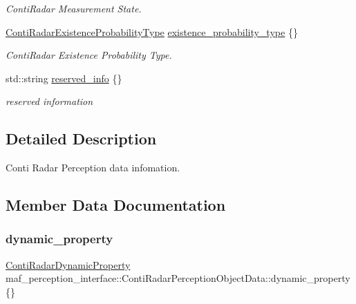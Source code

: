 \begin{DoxyCompactItemize}
\begin{DoxyCompactList}\small\item\em Conti\+Radar Measurement State. \end{DoxyCompactList}\item 
\hyperlink{structmaf__perception__interface_1_1ContiRadarExistenceProbabilityType}{Conti\+Radar\+Existence\+Probability\+Type} \hyperlink{structmaf__perception__interface_1_1ContiRadarPerceptionObjectData_ae0603b941a9d4936c0d31b8f5e3179dd}{existence\+\_\+probability\+\_\+type} \{\}
\begin{DoxyCompactList}\small\item\em Conti\+Radar Existence Probability Type. \end{DoxyCompactList}\item 
std\+::string \hyperlink{structmaf__perception__interface_1_1ContiRadarPerceptionObjectData_aba3e7e81f7f990656c1610c39377b168}{reserved\+\_\+info} \{\}
\begin{DoxyCompactList}\small\item\em reserved information \end{DoxyCompactList}\end{DoxyCompactItemize}


\subsection{Detailed Description}
Conti Radar Perception data infomation. 

\subsection{Member Data Documentation}
\mbox{\label{structmaf__perception__interface_1_1ContiRadarPerceptionObjectData_abfdb54b1a01f7892f5646086dddbf0a9}} 
\subsubsection{\texorpdfstring{dynamic\+\_\+property}{dynamic\_property}}
{\footnotesize\ttfamily \hyperlink{structmaf__perception__interface_1_1ContiRadarDynamicProperty}{Conti\+Radar\+Dynamic\+Property} maf\+\_\+perception\+\_\+interface\+::\+Conti\+Radar\+Perception\+Object\+Data\+::dynamic\+\_\+property \{\}}



